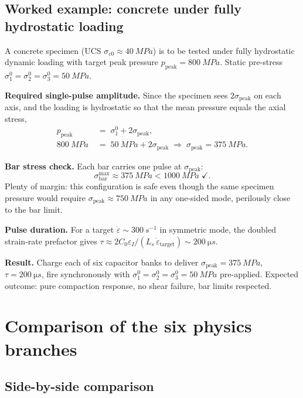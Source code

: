 \documentclass[11pt,a4paper,openany]{book}
\providecommand{\SI}[2]{\qty{#1}{#2}}
\theoremstyle{handbook}
\newcommand{\sig}{\sigma}
\newcommand{\eps}{\varepsilon}
\newcommand{\epsdot}{\dot\eps}
\newcommand{\Cz}{C_0}
\newcommand{\Ls}{L_s}
\newcommand{\sigpeak}{\sig_{\text{peak}}}
\begin{document}
\section{Worked example: concrete under fully hydrostatic loading}

A concrete specimen (UCS $\sig_{c0}\approx\SI{40}{MPa}$) is to be tested
under fully hydrostatic dynamic loading with target peak pressure
$p_{\text{peak}}=\SI{800}{MPa}$. Static pre-stress
$\sig_1^{0}=\sig_2^{0}=\sig_3^{0}=\SI{50}{MPa}$.

\textbf{Required single-pulse amplitude.} Since the specimen sees
$2\sigpeak$ on each axis, and the loading is hydrostatic so that the mean
pressure equals the axial stress,
\begin{align*}
  p_{\text{peak}} &\;=\; \sig_1^{0} + 2\sigpeak,\\
  \SI{800}{MPa} &\;=\; \SI{50}{MPa} + 2\sigpeak \;\Rightarrow\; \sigpeak=\SI{375}{MPa}.
\end{align*}

\textbf{Bar stress check.} Each bar carries one pulse at $\sigpeak$:
\[
  \sig_{\text{bar}}^{\max}\approx\SI{375}{MPa}<\SI{1000}{MPa}\;\checkmark.
\]
Plenty of margin: this configuration is safe even though the same specimen
pressure would require $\sigpeak\approx\SI{750}{MPa}$ in any one-sided
mode, perilously close to the bar limit.

\textbf{Pulse duration.} For a target $\epsdot\sim\SI{300}{s^{-1}}$ in
symmetric mode, the doubled strain-rate prefactor gives
$\tau\approx 2\Cz\eps_I/(\Ls\,\epsdot_{\text{target}})\sim\SI{200}{\micro s}$.

\textbf{Result.} Charge each of six capacitor banks to deliver
$\sigpeak=\SI{375}{MPa}$, $\tau=\SI{200}{\micro s}$, fire synchronously with
$\sig_1^{0}=\sig_2^{0}=\sig_3^{0}=\SI{50}{MPa}$ pre-applied. Expected
outcome: pure compaction response, no shear failure, bar limits
respected.


\chapter{Comparison of the six physics branches}\label{ch:comparison}

\section{Side-by-side comparison}
\end{document}
